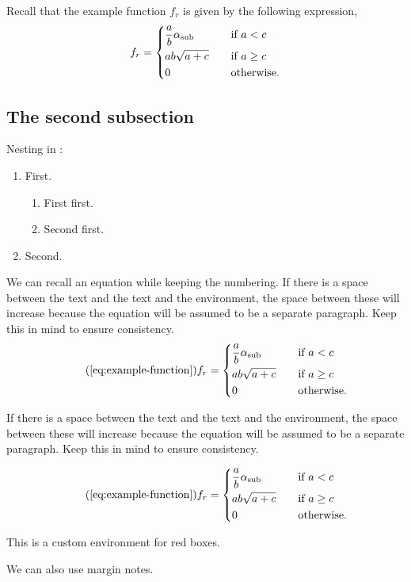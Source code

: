 Recall that the example function $f_r$ is given by the following expression,
\begin{equation}\label{eq:example-function}
    f_r=
    \begin{dcases}
        \frac{a}{b}\alpha_\text{sub} &\quad \text{if $a<c$} \\
        ab\sqrt{a+c} &\quad \text{if $a\geq c$} \\
        0 &\quad \text{otherwise.}
    \end{dcases}
\end{equation}


\subsection{The second subsection}

Nesting in :

\begin{enumerate}
    \item First.
    \begin{enumerate}[label=\roman*.] %
        \item First first.
        \item Second first.
    \end{enumerate}
    \item Second.
\end{enumerate}

We can recall an equation while keeping the numbering. If there is a space between the text and the text and the  environment, the space between these will increase because the equation will be assumed to be a separate paragraph. Keep this in mind to ensure consistency.
\begin{equation}\tag{\ref{eq:example-function}}
    f_r=
    \begin{dcases}
        \frac{a}{b}\alpha_\text{sub} &\quad \text{if $a<c$} \\
        ab\sqrt{a+c} &\quad \text{if $a\geq c$} \\
        0 &\quad \text{otherwise.}
    \end{dcases}
\end{equation}

If there is a space between the text and the text and the  environment, the space between these will increase because the equation will be assumed to be a separate paragraph. Keep this in mind to ensure consistency.

\begin{equation}\tag{\ref{eq:example-function}}
    f_r=
    \begin{dcases}
        \frac{a}{b}\alpha_\text{sub} &\quad \text{if $a<c$} \\
        ab\sqrt{a+c} &\quad \text{if $a\geq c$} \\
        0 &\quad \text{otherwise.}
    \end{dcases}
\end{equation}

\begin{redbox}
    This is a custom environment for red boxes.
\end{redbox}

We can also use margin notes. 
